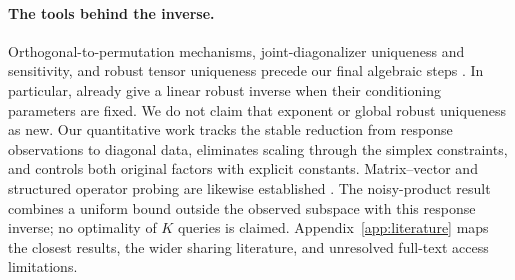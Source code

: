 \paragraph{The tools behind the inverse.}
Orthogonal-to-permutation mechanisms, joint-diagonalizer uniqueness and
sensitivity, and robust tensor uniqueness precede our final algebraic steps
\citep{dorrell2026convex,afsari2008sensitivity,bhaskara2014uniqueness}.
In particular, \citet[Thm.~5]{bhaskara2014uniqueness} already give a linear
robust inverse when their conditioning parameters are fixed. We do not claim
that exponent or global robust uniqueness as new. Our quantitative work
tracks the stable reduction from response observations to diagonal data,
eliminates scaling through the simplex constraints, and controls both
original factors with explicit constants. Matrix--vector and structured
operator probing are likewise established
\citep{novak2022fast,chiu2012matrix,halikias2024structured,amsel2026query}.
The noisy-product result combines a uniform bound outside the observed
subspace with this response inverse; no optimality of $K$ queries is claimed.
Appendix~\ref{app:literature} maps the closest results, the wider sharing
literature, and unresolved full-text access limitations.
